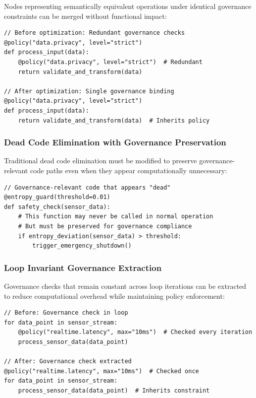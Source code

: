 Nodes representing semantically equivalent operations under identical governance constraints can be merged without functional impact:

\begin{lstlisting}[style=riftlang, language=rift]
// Before optimization: Redundant governance checks
@policy("data.privacy", level="strict")
def process_input(data):
    @policy("data.privacy", level="strict")  # Redundant
    return validate_and_transform(data)

// After optimization: Single governance binding
@policy("data.privacy", level="strict")
def process_input(data):
    return validate_and_transform(data)  # Inherits policy
\end{lstlisting}

\subsubsection{Dead Code Elimination with Governance Preservation}

Traditional dead code elimination must be modified to preserve governance-relevant code paths even when they appear computationally unnecessary:

\begin{lstlisting}[style=riftlang, language=rift]
// Governance-relevant code that appears "dead"
@entropy_guard(threshold=0.01)
def safety_check(sensor_data):
    # This function may never be called in normal operation
    # But must be preserved for governance compliance
    if entropy_deviation(sensor_data) > threshold:
        trigger_emergency_shutdown()
\end{lstlisting}

\subsubsection{Loop Invariant Governance Extraction}

Governance checks that remain constant across loop iterations can be extracted to reduce computational overhead while maintaining policy enforcement:

\begin{lstlisting}[style=riftlang, language=rift]
// Before: Governance check in loop
for data_point in sensor_stream:
    @policy("realtime.latency", max="10ms")  # Checked every iteration
    process_sensor_data(data_point)

// After: Governance check extracted
@policy("realtime.latency", max="10ms")  # Checked once
for data_point in sensor_stream:
    process_sensor_data(data_point)  # Inherits constraint
\end{lstlisting}

